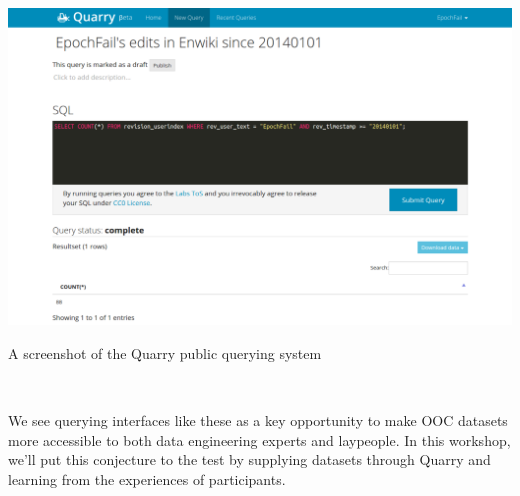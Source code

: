 \begin{marginfigure}[-35pc]
  \begin{minipage}{\marginparwidth}
    \centering
    \includegraphics[width=0.9\marginparwidth]{figures/quarry}
    \caption{A screenshot of the Quarry public querying system}~\label{fig:marginfig}
  \end{minipage}
\end{marginfigure}

We see querying interfaces like these as a key opportunity to make OOC datasets more accessible to both data engineering experts and laypeople.  In this workshop, we'll put this conjecture to the test by supplying datasets through Quarry and learning from the experiences of participants.

